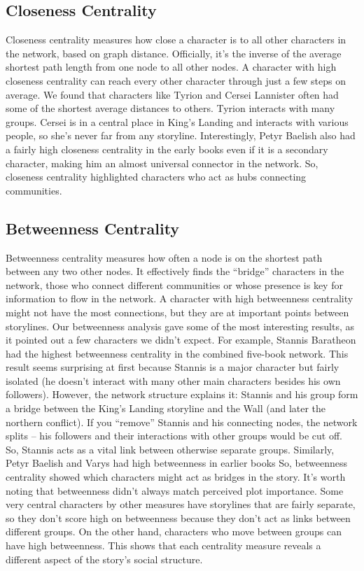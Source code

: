 \documentclass[12pt, a4paper]{article}
\begin{document}
\subsection*{Closeness Centrality}
Closeness centrality measures how close a character is to all 
other characters in the network, based on graph distance. 
Officially, it's the inverse of the average shortest path length 
from one node to all other nodes. A character with high closeness 
centrality can reach every other character through just a few steps 
on average. 
We found that characters like Tyrion and 
 Cersei Lannister often had some of the shortest average 
 distances to others. Tyrion interacts with 
 many groups. Cersei is in a central place in King's Landing 
 and interacts with various people, so she's never far from any storyline. 
 Interestingly, Petyr Baelish also had a 
 fairly high closeness centrality in the early books even if it is a secondary character,
  making him an almost universal 
 connector in the network. So, closeness centrality 
 highlighted characters who act as hubs connecting 
 communities.

\subsection*{Betweenness Centrality}
Betweenness centrality measures how often a node is on the 
shortest path between any two other nodes. It effectively 
finds the ``bridge'' characters in the network, those who 
connect different communities or whose presence is key for 
information to flow in the network. A character with high 
betweenness centrality might not have the most connections, 
but they are at important points between storylines. 
Our betweenness analysis gave some of the most interesting 
results, as it pointed out a few characters we didn't expect. 
For example, Stannis Baratheon had the highest betweenness 
centrality in the combined five-book network. This result 
seems surprising at first because Stannis is a major character but 
fairly isolated (he doesn't interact with many other main characters 
besides his own followers). However, the network structure explains 
it: Stannis and his group form a bridge between the King's Landing 
storyline and the Wall (and later the northern conflict). 
If you ``remove'' Stannis and his connecting nodes, 
the network splits – his followers 
and their interactions with other groups would be cut off. 
So, Stannis acts as a vital link between otherwise separate 
groups.
Similarly, Petyr Baelish and Varys had high 
betweenness in earlier books
So, betweenness centrality 
showed which characters might act as bridges in the story. It's 
worth noting that betweenness didn't always match perceived plot 
importance. Some very central characters by other measures 
 have storylines that are fairly separate, 
 so they don't score high on betweenness 
because they don't act as links between different groups. 
On the other hand, characters who move between groups 
can have high betweenness. This shows that each centrality 
measure reveals a different aspect of the story's social structure. 
\end{document}
